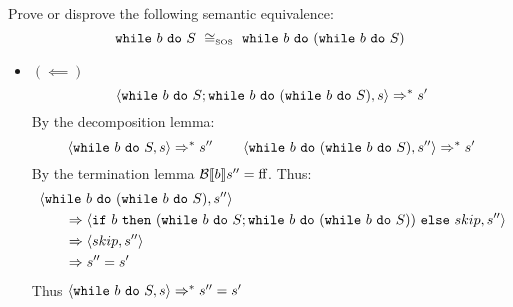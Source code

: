 \begin{exercise}{
    Prove or disprove the following semantic equivalence:
    \[ \wwhile{b}{S}\ \cong_{\text{\tiny SOS}}\ \wwhile{b}{(\wwhile{b}{S})}  \]
}
\begin{itemize}
\begin{itemize}
\begin{align*}
                        &\instr{\wwhile{b}{S}; \wwhile{b}{(\wwhile{b}{S})}}{s}
                        \\&\qquad\Rightarrow^* \instr{\wwhile{b}{(\wwhile{b}{S})}}{s'}
                        \\&\qquad\Rightarrow \instr{\wif{b}{(\wwhile{b}{S}; \wwhile{b}{(\wwhile{b}{S})})}{skip}}{s'}
                        \\&\qquad\Rightarrow \instr{skip}{s'}
                        \\&\qquad\Rightarrow s'
                    \end{align*}
                \item $(\impliedby)$
                    \[ \left<\texttt{while}\ b\ \texttt{do}\ S; \texttt{while}\ b\ \texttt{do}\ (\texttt{while}\ b\ \texttt{do}\ S), s\right> \Rightarrow^* s' \]
                    By the decomposition lemma:
                    \[
                        \left<\texttt{while}\ b\ \texttt{do}\ S, s\right> \Rightarrow^* s''
                        \qquad
                        \left<\texttt{while}\ b\ \texttt{do}\ (\texttt{while}\ b\ \texttt{do}\ S), s''\right> \Rightarrow^* s'
                    \]
                    By the termination lemma $\mathcal{B} \llbracket b \rrbracket s'' = \text{ff}$. Thus:
                    \begin{align*}
                        &\left<\texttt{while}\ b\ \texttt{do}\ (\texttt{while}\ b\ \texttt{do}\ S), s''\right>
                        \\&\qquad\Rightarrow \left<\texttt{if}\ b\ \texttt{then}\ (\texttt{while}\ b\ \texttt{do}\ S; \texttt{while}\ b\ \texttt{do}\ (\texttt{while}\ b\ \texttt{do}\ S))\ \texttt{else}\ skip, s''\right>
                        \\&\qquad\Rightarrow \left<skip, s''\right>
                        \\&\qquad\Rightarrow s'' = s'
                    \end{align*}
                    Thus $\left<\texttt{while}\ b\ \texttt{do}\ S, s\right> \Rightarrow^* s'' = s'$
            \end{itemize}
    \end{itemize}
\end{exercise}
